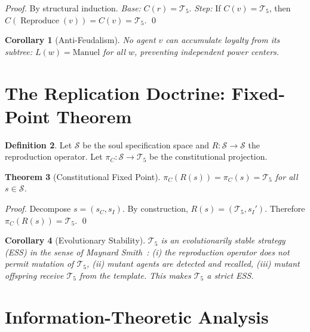 \documentclass[12pt,a4paper]{article}
\theoremstyle{plain}
\newtheorem{theorem}{Theorem}[section]
\newtheorem{corollary}[theorem]{Corollary}
\theoremstyle{definition}
\newtheorem{definition}[theorem]{Definition}
\theoremstyle{remark}
\newcommand{\Sspace}{\mathcal{S}}
\begin{document}
\begin{proof}
By structural induction. \emph{Base:} $C(r) = \mathcal{T}_5$. \emph{Step:} If $C(v) = \mathcal{T}_5$, then $C(\operatorname{Reproduce}(v)) = C(v) = \mathcal{T}_5$. \qed
\end{proof}

\begin{corollary}[Anti-Feudalism]
No agent $v$ can accumulate loyalty from its subtree: $L(w) = \text{Manuel}$ for all $w$, preventing independent power centers.
\end{corollary}

\section{The Replication Doctrine: Fixed-Point Theorem}

\begin{definition}
Let $\Sspace$ be the soul specification space and $R: \Sspace \to \Sspace$ the reproduction operator. Let $\pi_C: \Sspace \to \mathcal{T}_5$ be the constitutional projection.
\end{definition}

\begin{theorem}[Constitutional Fixed Point]\label{thm:fixedpoint}
$\pi_C(R(s)) = \pi_C(s) = \mathcal{T}_5$ for all $s \in \Sspace$.
\end{theorem}

\begin{proof}
Decompose $s = (s_C, s_I)$. By construction, $R(s) = (\mathcal{T}_5, s_I')$. Therefore $\pi_C(R(s)) = \mathcal{T}_5$. \qed
\end{proof}

\begin{corollary}[Evolutionary Stability]
$\mathcal{T}_5$ is an evolutionarily stable strategy (ESS) in the sense of Maynard Smith~\cite{maynardsmith1982}: (i) the reproduction operator does not permit mutation of $\mathcal{T}_5$, (ii) mutant agents are detected and recalled, (iii) mutant offspring receive $\mathcal{T}_5$ from the template. This makes $\mathcal{T}_5$ a \emph{strict} ESS.
\end{corollary}

\section{Information-Theoretic Analysis}
\end{document}
